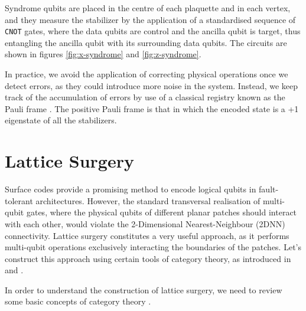 \documentclass[12pt, twoside, openany]{book}
\begin{document}
Syndrome qubits are placed in the centre of each plaquette and in each vertex, and they measure the stabilizer by the application of a standardised sequence of \texttt{CNOT} gates, where the data qubits are control and the ancilla qubit is target, thus entangling the ancilla qubit with its surrounding data qubits. The circuits are shown in figures \ref{fig:x-syndrome} and \ref{fig:z-syndrome}. 

In practice, we avoid the application of correcting physical operations once we detect errors, as they could introduce more noise in the system. Instead, we keep track of the accumulation of errors by use of a classical registry known as the Pauli frame \cite{deBeaudrap2020}. The positive Pauli frame is that in which the encoded state is a +1 eigenstate of all the stabilizers.

\chapter{Lattice Surgery} \label{ch:LS}

Surface codes provide a promising method to encode logical qubits in fault-tolerant architectures. However, the standard transversal realisation of multi-qubit gates, where the physical qubits of different planar patches should interact with each other, would violate the 2-Dimensional Nearest-Neighbour (2DNN) connectivity. Lattice surgery constitutes a very useful approach, as it performs multi-qubit operations exclusively interacting the boundaries of the patches. Let's construct this approach using certain tools of category theory, as introduced in \cite{Cowtan_2024} and \cite{cowtan2025fastfaulttolerantlogicalmeasurements}. 

In order to understand the construction of lattice surgery, we need to review some basic concepts of category theory \cite{cowtan2025homologyhopfalgebrasquantum}.
\end{document}
